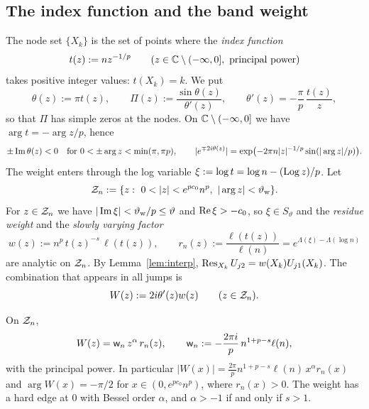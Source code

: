 \subsection{The index function and the band weight}\label{sec:frame-weight}
The node set $\{X_k\}$ is the set of points where the \emph{index function}
\begin{equation}\label{eq:t}
  t(z):=nz^{-1/p}\qquad(z\in\mathbb{C}\setminus(-\infty,0],\ \text{principal power})
\end{equation}
takes positive integer values: $t(X_k)=k$. We put
\begin{equation}\label{eq:theta}
  \theta(z):=\pi t(z),\qquad \Pi(z):=\frac{\sin\theta(z)}{\theta'(z)},\qquad \theta'(z)=-\frac{\pi}{p}\,\frac{t(z)}{z},
\end{equation}
so that $\Pi$ has simple zeros at the nodes. On $\mathbb{C}\setminus(-\infty,0]$ we have $\arg t=-\arg z/p$, hence
\begin{equation}\label{eq:imtheta}
  \pm\operatorname{Im}\theta(z)<0\quad\text{for }0<\pm\arg z<\min(\pi,\pi p),\qquad
  |e^{\mp2i\theta(z)}|=\exp\bigl(-2\pi n|z|^{-1/p}\sin(|\arg z|/p)\bigr).
\end{equation}
The weight enters through the log variable $\xi:=\log t=\log n-(\operatorname{Log} z)/p$. Let
\begin{equation}\label{eq:Zn}
  \Zn:=\{z:\ 0<|z|<e^{pc_0}n^p,\ |\arg z|<\thw\}.
\end{equation}
For $z\in\mathcal{Z}_n$ we have $|\operatorname{Im}\xi|<\vartheta_{\mathrm{w}}/p\le\vartheta$ and $\operatorname{Re}\xi>-c_0$, so $\xi\in S_\vartheta$ and the
\emph{residue weight} and the \emph{slowly varying factor}
\begin{equation}\label{eq:w-rn}
  w(z):=n^p\,t(z)^{-s}\,\ell(t(z)),\qquad r_n(z):=\frac{\ell(t(z))}{\ell(n)}=e^{\Lambda(\xi)-\Lambda(\log n)}
\end{equation}
are analytic on $\mathcal{Z}_n$. By Lemma~\ref{lem:interp}, $\operatorname*{Res}_{X_k}U_{j2}=w(X_k)U_{j1}(X_k)$. The combination that appears
in all jumps is
\begin{equation}\label{eq:W}
  W(z):=2i\theta'(z)w(z)\qquad(z\in\mathcal{Z}_n).
\end{equation}

\begin{lemma}\label{lem:bandweight}
On $\mathcal{Z}_n$,
\begin{equation}\label{eq:Wformula}
  W(z)=\mathsf w_n\,z^{\alpha}\,r_n(z),\qquad \mathsf w_n:=-\frac{2\pi i}{p}\,n^{1+p-s}\ell(n),
\end{equation}
with the principal power. In particular $|W(x)|=\frac{2\pi}{p}n^{1+p-s}\ell(n)\,x^\alpha r_n(x)$ and
$\arg W(x)=-\pi/2$ for $x\in(0,e^{pc_0}n^p)$, where $r_n(x)>0$. The weight has a hard edge at $0$ with Bessel order
$\alpha$, and $\alpha>-1$ if and only if $s>1$.
\end{lemma}


